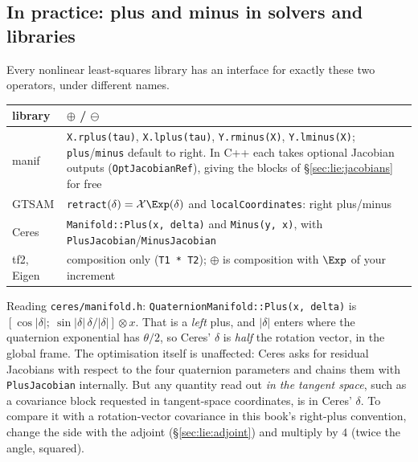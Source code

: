 \subsection{In practice: plus and minus in solvers and libraries}\label{sec:lie:exp-in-practice}

Every nonlinear least-squares library has an interface for exactly these two operators, under different names.
\begin{center}\small
\renewcommand{\arraystretch}{1.15}
\begin{tabularx}{\linewidth}{@{}l>{\raggedright\arraybackslash}X@{}}\toprule
library & $\oplus$ / $\ominus$\\\midrule
manif & \texttt{X.rplus(tau)}, \texttt{X.lplus(tau)}, \texttt{Y.rminus(X)}, \texttt{Y.lminus(X)}; \texttt{plus}/\texttt{minus} default to right. In C++ each takes optional Jacobian outputs (\texttt{OptJacobianRef}), giving the blocks of \S\ref{sec:lie:jacobians} for free\\
GTSAM & \texttt{retract}$(\delta)=\mathcal X\Exp(\delta)$ and \texttt{localCoordinates}: right plus/minus\\
Ceres & \texttt{Manifold::Plus(x, delta)} and \texttt{Minus(y, x)}, with \texttt{PlusJacobian}/\texttt{MinusJacobian}\\
tf2, Eigen & composition only (\texttt{T1 * T2}); $\oplus$ is composition with $\Exp$ of your increment\\\bottomrule
\end{tabularx}
\end{center}

\begin{pitfall}
Reading \texttt{ceres/manifold.h}: \texttt{QuaternionManifold::Plus(x, delta)} is $[\cos|\delta|;\ \sin|\delta|\,\delta/|\delta|]\otimes x$. That is a \emph{left} plus, and $|\delta|$ enters where the quaternion exponential has $\theta/2$, so Ceres' $\delta$ is \emph{half} the rotation vector, in the global frame. The optimisation itself is unaffected: Ceres asks for residual Jacobians with respect to the four quaternion parameters and chains them with \texttt{PlusJacobian} internally. But any quantity read out \emph{in the tangent space}, such as a covariance block requested in tangent-space coordinates, is in Ceres' $\delta$. To compare it with a rotation-vector covariance in this book's right-plus convention, change the side with the adjoint (\S\ref{sec:lie:adjoint}) and multiply by $4$ (twice the angle, squared).
\end{pitfall}
